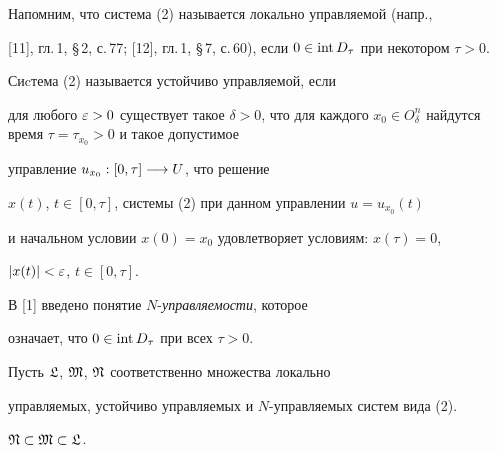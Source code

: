 Напомним, что система (2) называется локально управляемой (напр.,


[11], гл.\,1, \S\,2, с.\,77; [12], гл.\,1, \S\,7, с.\,60), если $0\in\intr


D_{\tau}$ при некотором $\tau>0$.





\begin{defn}


Сиcтема (2) называется устойчиво управляемой, если


для любого $\ve>0$ существует такое $\delta>0$, что для каждого $x_0\in


O_{\delta}^n$ найдутся время $\tau=\tau_{x_0}>0$ и такое допустимое


управление $u_{x_0}:[0,\tau]\longrightarrow U$, что решение


$x(t)$, $t\in[0,\tau]$, системы (2) при данном управлении $u=u_{x_0}(t)$


и начальном условии $x(0)=x_0$ удовлетворяет условиям: $x(\tau)=0$,


$|x(t)|<\varepsilon$, $t\in[0,\tau]$.


\end{defn}





В [1] введено понятие $N$-{\it управляемости}, которое


означает, что $0\in\operatorname{int} D_{\tau}$ при всех $\tau>0$.





Пусть $\frak L$, $\frak M$, $\frak N$ соответственно множества локально


управляемых, устойчиво управляемых и $N$-управляемых систем вида (2).





\begin{lem}


$\frak N\subset\frak M\subset\frak L$.


\end{lem}





